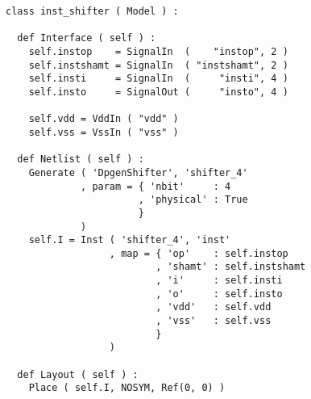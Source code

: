 \begin{itemize}
\begin{verbatim}
class inst_shifter ( Model ) :

  def Interface ( self ) :
    self.instop    = SignalIn  (    "instop", 2 )
    self.instshamt = SignalIn  ( "instshamt", 2 )
    self.insti     = SignalIn  (     "insti", 4 )
    self.insto     = SignalOut (     "insto", 4 )
    
    self.vdd = VddIn ( "vdd" )
    self.vss = VssIn ( "vss" )
    
  def Netlist ( self ) :
    Generate ( 'DpgenShifter', 'shifter_4'
             , param = { 'nbit'     : 4
                       , 'physical' : True
                       }
             )
    self.I = Inst ( 'shifter_4', 'inst'
                  , map = { 'op'    : self.instop
                          , 'shamt' : self.instshamt
                          , 'i'     : self.insti
                          , 'o'     : self.insto
                          , 'vdd'   : self.vdd
                          , 'vss'   : self.vss
                          }
                  )
    
  def Layout ( self ) :
    Place ( self.I, NOSYM, Ref(0, 0) )
\end{verbatim}
\end{itemize}
